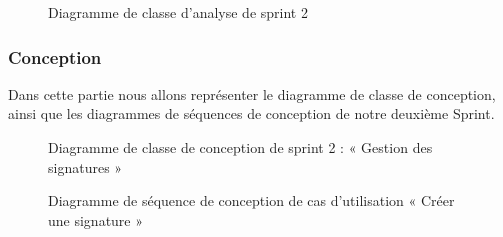 
\begin{figure}[H]
  \centering
  \caption{Diagramme de classe d'analyse de sprint 2}
  \label{fig:class_analyse_signatures}
\end{figure}


\subsubsection{Conception}
Dans cette partie nous allons représenter le diagramme de classe de conception, ainsi que les diagrammes de séquences de conception de notre deuxième Sprint. \\


\begin{figure}[H]
  \centering
  \caption{Diagramme de classe de conception de sprint 2 : « Gestion des signatures »}
  \label{fig:class_diagram_signatures}
\end{figure}


\begin{figure}[H]
  \centering
  \caption{Diagramme de séquence de conception de cas d'utilisation « Créer une signature  »}
  \label{fig:sequence_conception_create_signature}
\end{figure}

